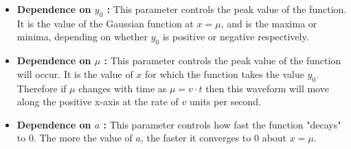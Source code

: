 \documentclass[12]{article}
\begin{document}
\begin{itemize}
    \item \textbf{Dependence on $y_0$ : }This parameter controls the peak value of the function. It is the value of the Gaussian function at $x = \mu$, and is the maxima or minima, depending on whether $y_0$ is positive or negative respectively.
    \item \textbf{Dependence on $\mu$ : }This parameter controls the peak value of the function will occur. It is the value of $x$  for which the function takes the value $y_0$. Therefore if $\mu$ changes with time as $\mu = v\cdot t$ then this waveform will move along the positive x-axis at the rate of $v$ units per second.
    \item \textbf{Dependence on $a$ : }This parameter controls how fast the function "decays" to $0$. The more the value of $a$, the faster it converges to $0$ about $x = \mu$.
\end{itemize}
\end{document}
